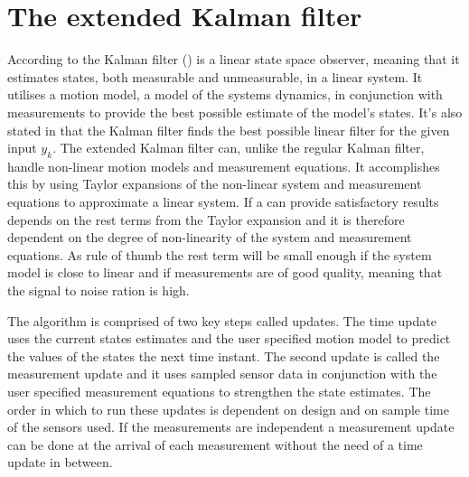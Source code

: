 \section{The extended Kalman filter}
According to \citet{sensorfusion} the Kalman filter (\abbrKF) is a linear state space observer, meaning that it estimates states, both measurable and unmeasurable, in a linear system. It utilises a motion model, a model of the systems dynamics, in conjunction with measurements to provide the best possible estimate of the model's states. It's also stated in \citet{sensorfusion} that the Kalman filter finds the best possible linear filter for the given input $y_{k}$. The extended Kalman filter can, unlike the regular Kalman filter, handle non-linear motion models and measurement equations. It accomplishes this by using Taylor expansions of the non-linear system and measurement equations to approximate a linear system. If a \abbrEKF can provide satisfactory results depends on the rest terms from the Taylor expansion and it is therefore dependent on the degree of non-linearity of the system and measurement equations\citep{sensorfusion}. As rule of thumb the rest term will be small enough if the system model is close to linear and if measurements are of good quality, meaning that the signal to noise ration is high. 

The \abbrEKF algorithm is comprised of two key steps called updates.
The time update uses the current states estimates and the user specified motion model to predict the values of the states the next time instant. The second update is called the measurement update and it uses sampled sensor data in conjunction with the user specified measurement equations to strengthen the state estimates. 
The order in which to run these updates is dependent on design and on sample time of the sensors used. If the measurements are independent a measurement update can be done at the arrival of each measurement without the need of a time update in between. 

